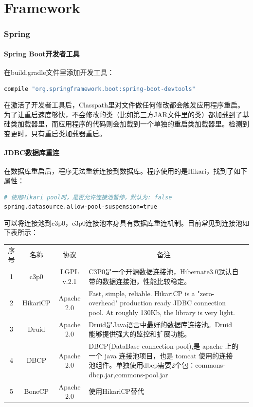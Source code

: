 \documentclass[letter]{book}
\begin{document}


\part{Framework}

\section*{Spring}

\subsection{Spring Boot开发者工具}

在build.gradle文件里添加开发工具：

\begin{lstlisting}[language=Bash]
compile "org.springframework.boot:spring-boot-devtools"
\end{lstlisting}

在激活了开发者工具后，Classpath里对文件做任何修改都会触发应用程序重启。为了让重启速度够快，不会修改的类（比如第三方JAR文件里的类）都加载到了基础类加载器里，而应用程序的代码则会加载到一个单独的重启类加载器里。检测到变更时，只有重启类加载器重启。

\subsection*{JDBC数据库重连}

在数据库重启后，程序无法重新连接到数据库。程序使用的是Hikari，找到了如下属性：

\begin{lstlisting}[language=Bash]
# 使用Hikari pool时，是否允许连接池暂停，默认为: false
spring.datasource.allow-pool-suspension=true
\end{lstlisting}

可以将连接池到c3p0，c3p0连接池本身具有数据库重连机制。目前常见到连接池如下表所示：

\begin{tabular}{|c|c|c|p{8cm}|c|}
	\hline
	\multirow{1}{*}{序号}
	& \multicolumn{1}{c|}{名称}  
	& \multicolumn{1}{c|}{协议} 
	& \multicolumn{1}{c|}{备注}\\			
	\cline{1-4}
	1 & c3p0 &  LGPL v.2.1  & C3P0是一个开源数据连接池，Hibernate3.0默认自带的数据连接池，性能比较稳定。\\
	\hline
	2 & HikariCP & Apache 2.0 & Fast, simple, reliable. HikariCP is a "zero-overhead" production ready JDBC connection pool. At roughly 130Kb, the library is very light. \\
	\hline
	3 & Druid & Apache 2.0 & Druid是Java语言中最好的数据库连接池。Druid能够提供强大的监控和扩展功能。 \\
	\hline
	4 & DBCP & Apache 2.0 & DBCP(DataBase connection pool),是 apache 上的一个 java 连接池项目，也是 tomcat 使用的连接池组件。单独使用dbcp需要2个包：commons-dbcp.jar,commons-pool.jar \\
	\hline
	5 & BoneCP & Apache 2.0 & 使用HikariCP替代\\
	\hline
\end{tabular}
\end{document}
